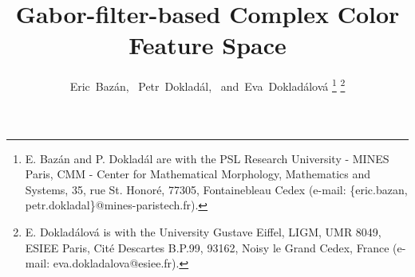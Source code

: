 \documentclass[journal]{IEEEtran}
\begin{document}
%
\title{Gabor-filter-based Complex Color Feature Space}
%
%
%

\author{Eric~Bazán,~%
        Petr~Dokladál,~%
        and~Eva~Dokladálová%
\thanks{E. Bazán and P. Dokladál are with the PSL Research University - MINES Paris, CMM - Center for Mathematical Morphology, Mathematics and Systems, 35, rue St. Honor\'{e}, 77305, Fontainebleau Cedex (e-mail: \{eric.bazan, petr.dokladal\}@mines-paristech.fr).}%
\thanks{E. Dokladálová is with the University Gustave Eiffel, LIGM, UMR 8049, ESIEE Paris, Cité Descartes B.P.99, 93162, Noisy le Grand Cedex, France (e-mail: eva.dokladalova@esiee.fr).}}%

% 
%
\end{document}
